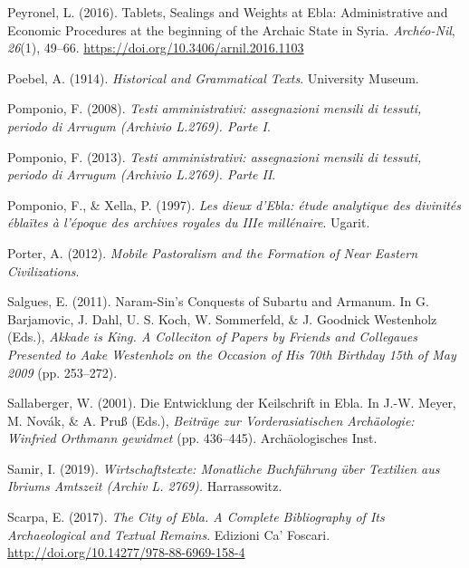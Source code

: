 \documentclass[
]{book}
\newlength{\cslhangindent}
\newlength{\cslentryspacingunit} %
\newenvironment{CSLReferences}[2] %
 {%
  \setlength{\parindent}{0pt}
  \ifodd #1
  \let\oldpar\par
  \def\par{\hangindent=\cslhangindent\oldpar}
  \fi
  \setlength{\parskip}{#2\cslentryspacingunit}
 }%
 {}
\begin{document}
\begin{CSLReferences}{1}{0}
\leavevmode{}%
Peyronel, L. (2016). Tablets, {Sealings} and {Weights} at {Ebla}: {Administrative} and {Economic Procedures} at the beginning of the {Archaic State} in {Syria}. \emph{Archéo-Nil}, \emph{26}(1), 49--66. \url{https://doi.org/10.3406/arnil.2016.1103}

\leavevmode{}%
Poebel, A. (1914). \emph{Historical and {Grammatical Texts}}. University Museum.

\leavevmode{}%
Pomponio, F. (2008). \emph{Testi amministrativi: assegnazioni mensili di tessuti, periodo di Arrugum (Archivio L.2769). Parte I}.

\leavevmode{}%
Pomponio, F. (2013). \emph{Testi amministrativi: assegnazioni mensili di tessuti, periodo di Arrugum (Archivio L.2769). Parte II}.

\leavevmode{}%
Pomponio, F., \& Xella, P. (1997). \emph{Les dieux d'Ebla: étude analytique des divinités éblaïtes à l'époque des archives royales du IIIe millénaire}. Ugarit.

\leavevmode{}%
Porter, A. (2012). \emph{Mobile {Pastoralism} and the {Formation} of {Near Eastern Civilizations}}.

\leavevmode{}%
Salgues, E. (2011). Naram-{Sin}'s {Conquests} of {Subartu} and {Armanum}. In G. Barjamovic, J. Dahl, U. S. Koch, W. Sommerfeld, \& J. Goodnick Westenholz (Eds.), \emph{Akkade is {King}. {A Colleciton} of {Papers} by {Friends} and {Collegaues Presented} to {Aake Westenholz} on the {Occasion} of {His} 70th {Birthday} 15th of {May} 2009} (pp. 253--272).

\leavevmode{}%
Sallaberger, W. (2001). Die Entwicklung der Keilschrift in Ebla. In J.-W. Meyer, M. Novák, \& A. Pruß (Eds.), \emph{Beiträge zur Vorderasiatischen Archäologie: Winfried Orthmann gewidmet} (pp. 436--445). Archäologisches Inst.

\leavevmode{}%
Samir, I. (2019). \emph{Wirtschaftstexte: Monatliche Buchführung über Textilien aus Ibriums Amtszeit (Archiv L. 2769).} Harrassowitz.

\leavevmode{}%
Scarpa, E. (2017). \emph{The {City} of {Ebla}. {A Complete Bibliography} of {Its Archaeological} and {Textual Remains}}. Edizioni Ca' Foscari. \url{http://doi.org/10.14277/978-88-6969-158-4}


\end{CSLReferences}
\end{document}
